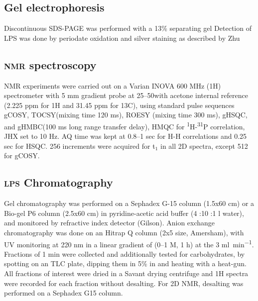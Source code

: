 	\subsection{Gel electrophoresis} %
	\label{sub:gel_electrophoresis}

		Discontinuous \ac{SDS-PAGE} was performed with a 13\% separating gel Detection of \ac{LPS} was done by periodate oxidation and silver staining as described by Zhu \etal{}

	\subsection{\textsc{nmr} spectroscopy} %
	\label{sub:nmr_spectroscopy}

		\ac{NMR} experiments were carried out on a Varian INOVA 600 \si{\mega\hertz} (1H) spectrometer with 5 \si{\milli\meter} gradient probe at 25--50\cel with acetone internal reference (2.225 ppm for 1H and 31.45 ppm for 13C), using standard pulse sequences \ac{gCOSY}, \ac{TOCSY}(mixing time 120 \si{\milli\second}), \ac{ROESY} (mixing time 300 \si{\milli\second}),  \ac{gHSQC}, and  \ac{gHMBC}(100 \si{\milli\second} long range transfer delay), \ac{HMQC} for \textsuperscript{1}H-\textsuperscript{31}P correlation, JHX set to 10 \si{\hertz}. AQ time was kept at 0.8--1 sec for H-H correlations and 0.25 sec for \ac{HSQC}. 256 increments were acquired for t$_1$ in all 2D spectra, except 512 for \ac{gCOSY}.

	\subsection{\textsc{lps} Chromatography} %
	\label{sub:chromatography}

		Gel chromatography was performed on a Sephadex G-15 column (1.5x60 cm) or a Bio-gel P6 column (2.5x60 cm) in pyridine-acetic acid buffer (4 \millilitre:10 \millilitre:1 \si{\litre} water), and monitored by refractive index detector (Gilson). Anion exchange chromatography was done on an Hitrap Q column (2x5 \millilitre size, Amersham), with \ac{UV} monitoring at 220 nm in a linear gradient of  (0--1 M, 1 h) at the 3 \si{\milli\litre\per\minute}. Fractions of 1 min were collected and additionally tested for carbohydrates, by spotting on an  \ac{TLC} plate, dipping them in 5\%  in  and heating with a heat-gun. All fractions of interest were dried in a Savant drying centrifuge and 1H spectra were recorded for each fraction without desalting. For 2D \ac{NMR}, desalting was performed on a Sephadex G15 column. 


